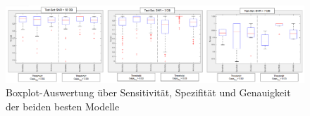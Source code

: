 \begin{appendices}
\begin{landscape}
 \begin{figure}[h]
	\centering
	\includegraphics[width=1.6\textwidth]{bilder/all_boxplots.png}
	\caption{Boxplot-Auswertung über Sensitivität, Spezifität und Genauigkeit der beiden besten Modelle}
	\label{img:boxplots}
\end{figure}

\end{landscape}

\end{appendices}
